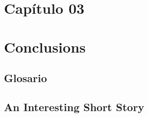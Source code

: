 \documentclass[pdftex,spanish]{pucthesis}	%
\begin{document}
\chapter[Capítulo 03]{Capítulo 03} \label{ch3}


\chapter[CONCLUSIONS]{Conclusions}



\cleardoublepage
{} \label{references}

\renewcommand{\bibname}{REFERENCES}



\appendix %

\newpage
\section[Glosario]{Glosario} \label{dictionary}


\newpage
\section[An Interesting Short Story]{An Interesting Short Story}

\end{document}

